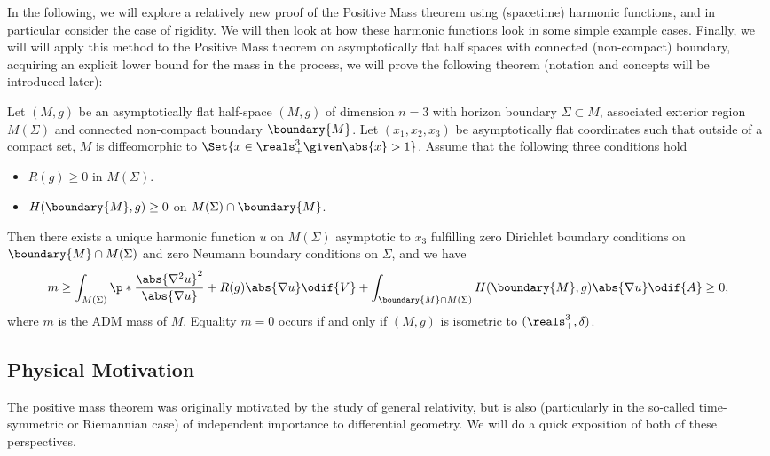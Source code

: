 \documentclass[titlepage,numbers=noenddot,headinclude,oneside,%
footinclude=true,cleardoublepage=empty,%
BCOR=5mm,paper=a4,fontsize=11pt,%
english,%
]{scrartcl}
\begin{document}
In the following, we will explore a relatively new proof of the Positive Mass theorem using (spacetime) harmonic functions, and in particular consider the case of rigidity. We will then look at how these harmonic functions look in some simple example cases. Finally, we will will apply this method to the Positive Mass theorem on asymptotically flat half spaces with connected (non-compact) boundary, acquiring an explicit lower bound for the mass in the process, \ie we will prove the following theorem (notation and concepts will be introduced later):

\begin{theorem}
    Let \( (M,g) \) be an asymptotically flat half-space \( (M,g) \) of dimension \( n=3 \) with horizon boundary \( \Sigma\subset M \), associated exterior region \( M(\Sigma) \) and connected non-compact boundary \( \boundary{M} \). Let \( (x_1,x_2,x_3) \) be asymptotically flat coordinates such that outside of a compact set, \( M \) is diffeomorphic to \( \Set{x\in \reals^3_+\given \abs{x}>1} \). Assume that the following three conditions hold
    \begin{itemize}
        \item \( R(g)\geq 0 \) in \( M(\Sigma) \).
        \item \( H(\boundary{M},g)\geq 0 \) on \( M(\Sigma)\cap \boundary{M} \).
    \end{itemize}
    Then there exists a unique harmonic function \( u \) on \( M(\Sigma) \) asymptotic to \( x_3 \) fulfilling zero Dirichlet boundary conditions on \( \boundary{M}\cap M(\Sigma) \) and zero Neumann boundary conditions on \( \Sigma \), and we have
    \begin{equation*}
        m\geq \int_{M(\Sigma)}\p*{\frac{\abs{\nabla^2 u}^2}{\abs{\nabla u}}+R(g)\abs{\nabla u}}\odif{V}+\int_{\boundary{M}\cap M(\Sigma)}H(\boundary{M},g)\abs{\nabla u}\odif{A}\geq 0,
    \end{equation*}
    where \( m \) is the ADM mass of \( M \). Equality \( m=0 \) occurs if and only if \( (M,g) \) is isometric to \( (\reals^3_+,\delta) \). 
\end{theorem}
\subsection{Physical Motivation}
The positive mass theorem was originally motivated by the study of general relativity, but is also (particularly in the so-called time-symmetric or Riemannian case) of independent importance to differential geometry. We will do a quick exposition of both of these perspectives.
\end{document}
